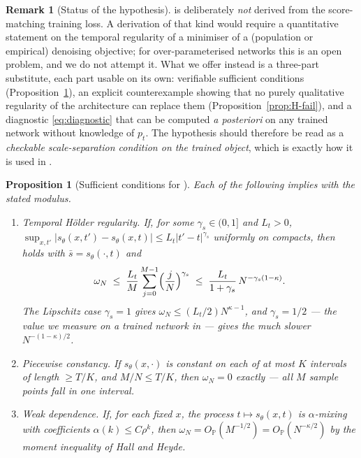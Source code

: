 \documentclass[a4paper,fleqn]{cas-dc}
\newtheorem{proposition}[theorem]{Proposition}
\theoremstyle{definition}
\newtheorem{remark}[theorem]{Remark}
\newcommand{\PP}{\mathbb{P}}
\begin{document}
\begin{remark}[Status of the hypothesis]
\label{rem:H-scope}
 is deliberately \emph{not} derived from the score-matching training loss.
A derivation of that kind would require a quantitative statement on the temporal
regularity of a minimiser of a (population or empirical) denoising objective; for
over-parameterised networks this is an open problem, and we do not attempt it. What we
offer instead is a three-part substitute, each part usable on its own:
verifiable sufficient conditions (Proposition~\ref{prop:H-suff}), an explicit counterexample
showing that no purely qualitative regularity of the architecture can replace them
(Proposition~\ref{prop:H-fail}), and a diagnostic \eqref{eq:diagnostic} that can be computed
\emph{a posteriori} on any trained network without knowledge of $p_{t}$. The
hypothesis should therefore be read as a \emph{checkable scale-separation condition on
the trained object}, which is exactly how it is used in .
\end{remark}

\begin{proposition}[Sufficient conditions for ]
\label{prop:H-suff}
Each of the following implies  with the stated modulus.
\begin{enumerate}
\item[\textup{(i)}] \emph{Temporal H\"older regularity.} If, for some
$\gamma_{s}\in(0,1]$ and $L_{t}>0$,
$\sup_{x,t'}\lvert s_{\theta}(x,t')-s_{\theta}(x,t)\rvert\le L_{t}\lvert t'-t\rvert^{\gamma_{s}}$
uniformly on compacts, then  holds with $\bar s=s_{\theta}(\cdot,t)$ and
\begin{equation}
\omega_{N}\;\le\;\frac{L_{t}}{M}\sum_{j=0}^{M-1}\Bigl(\frac{j}{N}\Bigr)^{\gamma_{s}}
\;\le\;\frac{L_{t}}{1+\gamma_{s}}\,N^{-\gamma_{s}(1-\kappa)} .
\label{eq:omega-lip}
\end{equation}
The Lipschitz case $\gamma_{s}=1$ gives $\omega_{N}\le(L_{t}/2)N^{\kappa-1}$, and
$\gamma_{s}=1/2$ --- the value we measure on a trained network in
 --- gives the much slower $N^{-(1-\kappa)/2}$.
\item[\textup{(ii)}] \emph{Piecewise constancy.} If $s_{\theta}(x,\cdot)$ is constant on
each of at most $K$ intervals of length $\ge T/K$, and $M/N\le T/K$, then
$\omega_{N}=0$ exactly --- all $M$ sample points fall in one interval.
\item[\textup{(iii)}] \emph{Weak dependence.} If, for each fixed $x$, the process
$t\mapsto s_{\theta}(x,t)$ is $\alpha$-mixing with coefficients $\alpha(k)\le
C\rho^{k}$, then $\omega_{N}=O_{\PP}(M^{-1/2})=O_{\PP}(N^{-\kappa/2})$ by the
moment inequality of Hall and Heyde.
\end{enumerate}
\end{proposition}
\end{document}
